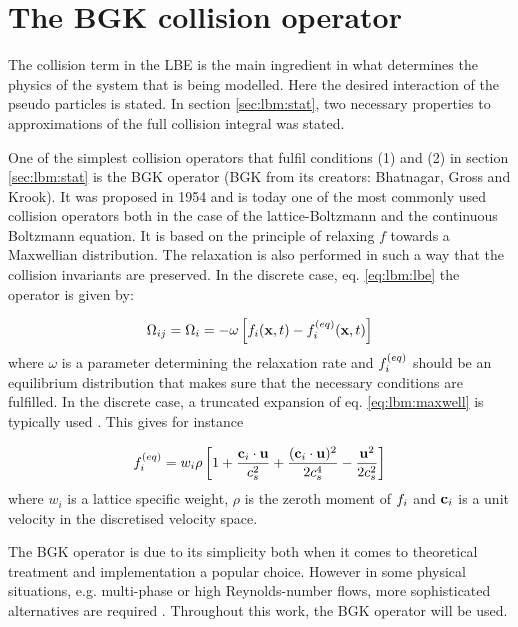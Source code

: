 \section{The BGK collision operator}\label{sec:lbm:col}
The collision term in the LBE is the main ingredient in what
determines the physics of the system that is being modelled. Here the
desired interaction of the pseudo particles is stated. In section
\ref{sec:lbm:stat}, two necessary properties to approximations of the
full collision integral was stated.

One of the simplest collision operators that fulfil conditions (1)
and (2) in section \ref{sec:lbm:stat} is the BGK operator (BGK from
its creators: Bhatnagar, Gross and Krook). It was proposed in 1954 and
is today one of the most commonly used collision operators both in the
case of the lattice-Boltzmann and the continuous Boltzmann
equation. It is based on the principle of relaxing $f$ towards a
Maxwellian distribution. The relaxation is also performed in such a
way that the collision invariants are preserved.  In the discrete case,
eq. \eqref{eq:lbm:lbe} the operator is given by:

\begin{equation}\label{eq:lbm:bgk}
\Omega_{ij} = \Omega_i = -\omega \left[ f_i(\mathbf{x}, t) - f_i^{(eq)}(\mathbf{x}, t)
  \right]
\end{equation}
where $\omega$ is a parameter determining the relaxation rate and
$f_i^{(eq)}$ should be an equilibrium distribution that makes sure that the
necessary conditions are fulfilled. In the discrete case, a truncated
expansion of eq. \eqref{eq:lbm:maxwell} is typically used
\cite{wolf-gladrow}. This gives for instance


\begin{equation}
f_i^{(eq)} = w_i\rho \left [ 1 + \frac{\mathbf{c}_i \cdot \mathbf{u}}{c_s^2} +
  \frac{(\mathbf{c}_i \cdot \mathbf{u})^2}{2c_s^4} - \frac{\mathbf{u}^2}{2c_s^2} \right]
\end{equation}
where $w_i$ is a lattice specific weight, $\rho$ is the zeroth moment
of $f_i$ and $\mathbf{c}_i$ is a unit velocity in the discretised velocity
space.

The BGK operator is due to its simplicity both when it comes to
theoretical treatment and implementation a popular choice. However in
some physical situations, e.g. multi-phase or high Reynolds-number
flows, more sophisticated alternatives are required
\cite{wolf-gladrow}. Throughout this work, the BGK operator will be
used.


